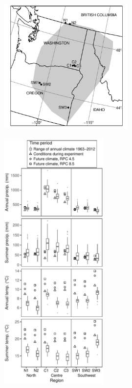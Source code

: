 \documentclass{article}
\begin{document}
{{{{{\clearpage


\begin{figure}[p]
\centering
\includegraphics[width = 0.6\textwidth]{figs/map}
\caption{}
\label{map}
\end{figure}


\clearpage


\begin{figure}[p]
\centering
\includegraphics[width = 0.48\textwidth]{figs/climate}
\caption{}
\label{climate}
\end{figure}


}}}}}
\end{document}
